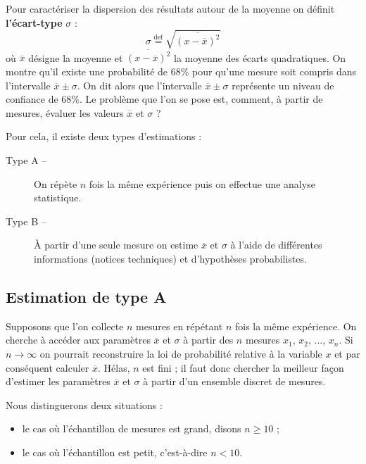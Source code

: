 Pour caractériser la dispersion des résultats autour de la moyenne on définit \textbf{l'écart-type} $\sigma$ : 
\[
	\sigma\stackrel{\text{def}}=\sqrt{\overline{(x-\overline{x})^2}}
\]
où $\overline{x}$ désigne la moyenne et $\overline{(x-\overline{x})^2}$ la moyenne des écarts quadratiques. On montre qu'il existe une probabilité de 68\% pour qu'une mesure soit compris dans l'intervalle $\overline{x}\pm\sigma$. On dit alors que l'intervalle $\overline{x}\pm\sigma$ représente un niveau de confiance de 68\%. Le problème que l'on se pose est, comment, à partir de mesures, évaluer les valeurs $\overline{x}$ et $\sigma$ ?

Pour cela, il existe deux types d'estimations : 
\begin{description}
	\item[Type A --] On répète $n$ fois la même expérience puis on effectue une analyse statistique.
	
	\item[Type B --] À partir d'une seule mesure on estime $\overline{x}$ et $\sigma$ à l'aide de différentes informations (notices techniques) et d'hypothèses probabilistes.
\end{description}
\subsection{Estimation de type A}%
Supposons que l'on collecte $n$ mesures en répétant $n$ fois la même expérience. On cherche à accéder aux paramètres $\overline{x}$ et $\sigma$ à partir des $n$ mesures $x_1$, $x_2$, ..., $x_n$. Si $n\to \infty$ on pourrait reconstruire la loi de probabilité relative  à la variable $x$ et par conséquent calculer $\overline{x}$. Hélas, $n$ est fini ; il faut donc chercher la meilleur façon d'estimer les paramètres $\overline{x}$ et $\sigma$ à partir d'un ensemble discret de mesures.

Nous distinguerons  deux situations : 
\begin{itemize}
	\item le cas où l'échantillon de mesures est grand,  disons $n\geq10$ ;	
	\item le cas où l'échantillon est petit, c'est-à-dire $n<10$.
\end{itemize}

